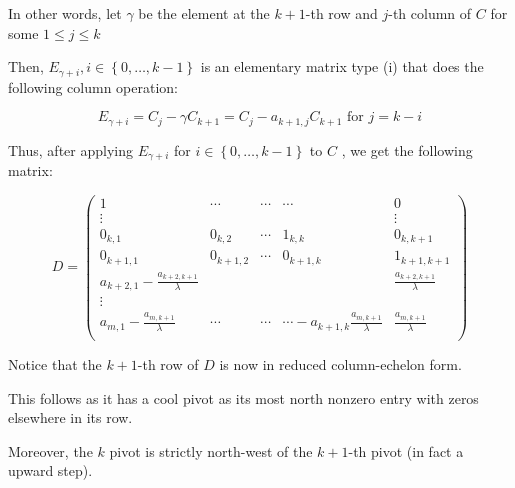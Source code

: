 \documentclass{report}
\begin{document}
{{{			In other words, let \(\gamma\) be the element at the \(k + 1\)-th row and \(j\)-th column of \(C\) for some \(1 \le j \le k\)

			Then, \(E_{\gamma + i}, i \in \left\{ 0, \ldots, k - 1 \right\} \) is an elementary matrix type (i) that does the following column operation:

			\[
				E_{\gamma + i} = C_{j} - \gamma C_{k + 1} = C_{j} - a_{k+1, j} C_{k + 1} \text{ for } j = k - i
			\]

			Thus, after applying \(E_{\gamma + i}\) for \(i \in \left\{ 0, \ldots, k - 1 \right\}\) to \(C\) , we get the following matrix:

			\[
				D = \begin{pmatrix}
					1                                         & \cdots     & \cdots & \cdots                                         & 0                            \\
					\vdots                                    &            &        &                                                & \vdots                       \\
					0_{k, 1}                                  & 0_{k, 2}   & \cdots & 1_{k, k}                                       & 0_{k, k+1}                   \\
					0_{k+1, 1}                                & 0_{k+1, 2} & \cdots & 0_{k+1, k}                                     & 1_{k+1,k+1}                  \\
					a_{k+2, 1} - \frac{a_{k+2, k+1}}{\lambda} &            &        &                                                & \frac{a_{k+2, k+1}}{\lambda} \\
					\vdots                                    &            &        &                                                &                              \\
					a_{m, 1}- \frac{a_{m, k+1}}{\lambda}      & \cdots     & \cdots & \cdots  - a_{k+1, k}\frac{a_{m, k+1}}{\lambda} & \frac{a_{m, k+1}}{\lambda}
					\\\end{pmatrix}
			\]

			Notice that the \(k + 1\)-th row of \(D\) is now in reduced column-echelon form.

			This follows as it has a cool pivot as its most north nonzero entry with zeros elsewhere in its row.

			Moreover, the \(k\) pivot is strictly north-west of the \(k + 1\)-th pivot (in fact a upward step).

}}}
\end{document}
